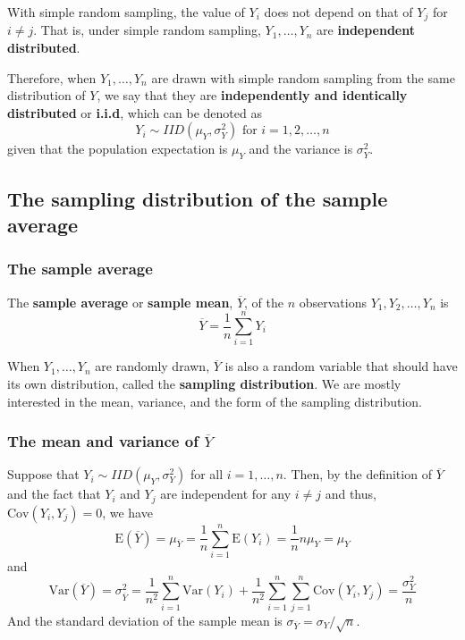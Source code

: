 \documentclass[a4paper,11pt]{article}
\begin{document}
With simple random sampling, the value of \(Y_i\) does not depend on
that of \(Y_j\) for \(i \neq j\). That is, under simple random sampling,
\(Y_1, \ldots, Y_n\) are \textbf{independent distributed}. 

Therefore, when \(Y_1, \ldots, Y_n\) are drawn with simple random
sampling from the same distribution of \(Y\), we say that they are
\textbf{independently and identically distributed} or \textbf{i.i.d}, which can be
denoted as 
\[ Y_i \sim IID(\mu_Y, \sigma^2_Y) \text{ for } i = 1, 2, \ldots, n\]
given that the population expectation is \(\mu_Y\) and the variance
is \(\sigma^2_Y\).


\subsection{The sampling distribution of the sample average}
\label{sec:org2db0ee7}

\subsubsection*{The sample average}
\label{sec:org28b06d0}

The \textbf{sample average} or \textbf{sample mean}, \(\overline{Y}\), of the \(n\)
observations \(Y_1, Y_2, \ldots, Y_n\) is
\[ \overline{Y} = \frac{1}{n}\sum^n_{i=1} Y_i \]

When \(Y_1, \ldots, Y_n\) are randomly drawn, \(\overline{Y}\) is also a
random variable that should have its own distribution, called the
\textbf{sampling distribution}. We are mostly interested in the mean,
variance, and the form of the sampling distribution.

\subsubsection*{The mean and variance of \(\overline{Y}\)}
\label{sec:orgc2ed74e}

Suppose that \(Y_i \sim IID(\mu_Y, \sigma^2_{Y})\) for all \(i = 1,
\ldots, n\). Then, by the definition of \(\overline{Y}\) and the fact
that \(Y_i\) and \(Y_j\) are independent for any \(i \neq j\) and thus,
\(\mathrm{Cov}(Y_i, Y_j)=0\), we have
\[
\mathrm{E}(\overline{Y}) = \mu_{\overline{Y}} =
\frac{1}{n}\sum^n_{i=1}\mathrm{E}(Y_i) = \frac{1}{n} n \mu_Y = \mu_Y
\]
and
\[
\mathrm{Var}(\overline{Y}) = \sigma^2_{\overline{Y}} =  \frac{1}{n^2}\sum^n_{i=1}\mathrm{Var}(Y_i) +
\frac{1}{n^2}\sum^n_{i=1}\sum^n_{j=1}\mathrm{Cov}(Y_i, Y_j) =
\frac{\sigma^2_Y}{n}
\]
And the standard deviation of the sample mean is
\(\sigma_{\overline{Y}} = \sigma_Y / \sqrt{n}\).
\end{document}
